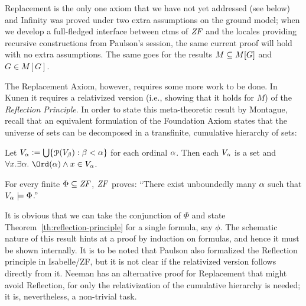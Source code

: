 


Replacement is the only one axiom that we have not yet addressed (see
below) and Infinity was proved under two extra assumptions on the
ground model; when we develop a full-fledged interface between ctms of
$\mathit{ZF}$ and the locales providing recursive constructions from Paulson's
 session, the same current proof will hold
with no extra assumptions. The same goes for the results $M\subseteq M[G]$
and $G\in M[G]$.

The Replacement Axiom, however, requires some more work to be
done. In Kunen it
requires a relativized version (i.e., showing that it holds for $M$)
of the \emph{Reflection Principle}. In order to state this
meta-theoretic result by Montague, recall that an equivalent
formulation of the Foundation Axiom states that the universe of sets
can be decomposed in a transfinite, cumulative hierarchy of sets:
\begin{theorem}
  Let $V_{\alpha}\mathrel{\mathop:}=\mathop{\textstyle\bigcup}\{\mathop{\mathcal{P}}(V_\beta) : \beta<\alpha\}$ for each ordinal
  $\alpha$. Then each $V_\alpha$ is a set and 
  $\forall x. \exists\al .\ \Ord(\al) \y x\in V_\al$.  
\end{theorem}
\begin{theorem}\label{th:reflection-principle}
  For every finite $\Phi\subseteq\mathit{ZF}$, $\mathit{ZF}$ proves: ``There exist
  unboundedly many $\alpha$ such that $V_\alpha\models \Phi$.''
\end{theorem}

It is obvious that we can take the conjunction of $\Phi$ and state
Theorem~\ref{th:reflection-principle} for a single formula, say
$\phi$.  The schematic nature of this result hints at a proof by
induction on formulas, and hence it must be shown internally. It is to
be noted that Paulson \cite{DBLP:conf/cade/Paulson02} also formalized
the Reflection principle in Isabelle/ZF, but it is not clear if the
relativized version follows directly from it. Neeman
\cite{neeman-course} has an alternative proof for Replacement that
might avoid Reflection, for only the relativization of the
cumulative hierarchy is needed; it is, nevertheless, a non-trivial
task.

